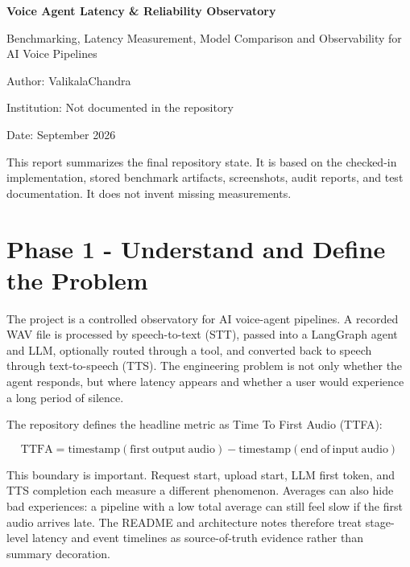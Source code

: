 \documentclass[11pt,a4paper]{article}
\begin{document}
\begin{titlepage}
  \centering
  \vspace*{1.0cm}
  {\Huge \textbf{Voice Agent Latency \& Reliability Observatory}\par}
  \vspace{0.5cm}
  {\Large Benchmarking, Latency Measurement, Model Comparison and Observability for AI Voice Pipelines\par}
  \vspace{1.5cm}
  {\large Author: ValikalaChandra\par}
  \vspace{0.2cm}
  {\large Institution: Not documented in the repository\par}
  \vspace{0.2cm}
  {\large Date: September 2026\par}
  \vfill
  \begin{minipage}{0.85\textwidth}
  \small
  This report summarizes the final repository state. It is based on the checked-in
  implementation, stored benchmark artifacts, screenshots, audit reports, and
  test documentation. It does not invent missing measurements.
  \end{minipage}
\end{titlepage}

\tableofcontents
\newpage

\section{Phase 1 - Understand and Define the Problem}

The project is a controlled observatory for AI voice-agent pipelines. A recorded
WAV file is processed by speech-to-text (STT), passed into a LangGraph agent and
LLM, optionally routed through a tool, and converted back to speech through
text-to-speech (TTS). The engineering problem is not only whether the agent
responds, but where latency appears and whether a user would experience a long
period of silence.

The repository defines the headline metric as Time To First Audio (TTFA):

\[
\mathrm{TTFA} = \mathrm{timestamp(first\ output\ audio)} -
\mathrm{timestamp(end\ of\ input\ audio)}
\]

This boundary is important. Request start, upload start, LLM first token, and
TTS completion each measure a different phenomenon. Averages can also hide bad
experiences: a pipeline with a low total average can still feel slow if the
first audio arrives late. The README and architecture notes therefore treat
stage-level latency and event timelines as source-of-truth evidence rather than
summary decoration.
\end{document}
